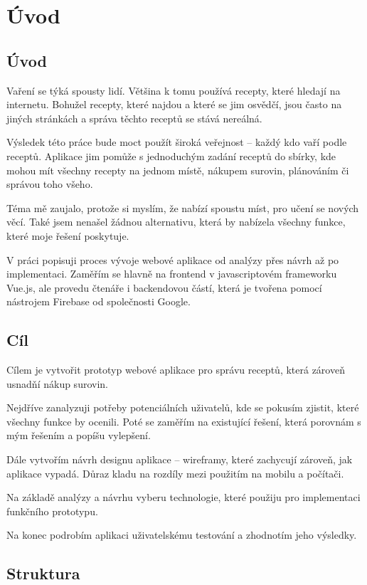 
\chapter{Úvod}

\section{Úvod}
Vaření se týká spousty lidí. Většina k tomu používá recepty, které hledají na internetu. Bohužel recepty, které najdou
a které se jim osvědčí, jsou často na jiných stránkách a správa těchto receptů se stává nereálná.

Výsledek této práce bude moct použít široká veřejnost -- každý kdo vaří podle receptů. Aplikace jim pomůže s jednoduchým
zadání receptů do sbírky, kde mohou mít všechny recepty na jednom místě, nákupem surovin, plánováním či správou toho všeho.

Téma mě zaujalo, protože si myslím, že nabízí spoustu míst, pro učení se nových věcí. Také jsem nenašel žádnou alternativu,
která by nabízela všechny funkce, které moje řešení poskytuje.

V práci popisuji proces vývoje webové aplikace od analýzy přes návrh až po implementaci. Zaměřím se hlavně na frontend v
javascriptovém frameworku Vue.js, ale provedu čtenáře i backendovou částí, která je tvořena pomocí nástrojem Firebase od
společnosti Google.

\section{Cíl}
Cílem je vytvořit prototyp webové aplikace pro správu receptů, která zároveň usnadňí nákup surovin.

Nejdříve zanalyzuji potřeby potenciálních uživatelů, kde se pokusím zjistit, které všechny funkce by ocenili. Poté se
zaměřím na existující řešení, která porovnám s mým řešením a popíšu vylepšení.

Dále vytvořím návrh designu aplikace -- wireframy, které zachycují zároveň, jak aplikace vypadá. Důraz kladu na rozdíly
mezi použitím na mobilu a počítači.

Na základě analýzy a návrhu vyberu technologie, které použiju pro implementaci funkčního prototypu.

Na konec podrobím aplikaci uživatelskému testování a zhodnotím jeho výsledky.

\section{Struktura}
